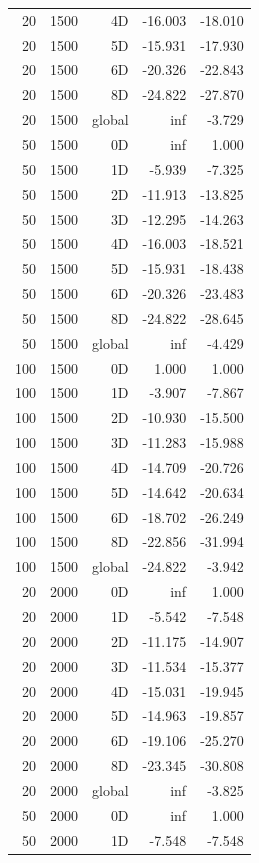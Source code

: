 \begin{longtable}{rrrrr}
20 & 1500 & 4D & -16.003 & -18.010 \\
20 & 1500 & 5D & -15.931 & -17.930 \\
20 & 1500 & 6D & -20.326 & -22.843 \\
20 & 1500 & 8D & -24.822 & -27.870 \\
20 & 1500 & global & inf & -3.729 \\
50 & 1500 & 0D & inf & 1.000 \\
50 & 1500 & 1D & -5.939 & -7.325 \\
50 & 1500 & 2D & -11.913 & -13.825 \\
50 & 1500 & 3D & -12.295 & -14.263 \\
50 & 1500 & 4D & -16.003 & -18.521 \\
50 & 1500 & 5D & -15.931 & -18.438 \\
50 & 1500 & 6D & -20.326 & -23.483 \\
50 & 1500 & 8D & -24.822 & -28.645 \\
50 & 1500 & global & inf & -4.429 \\
100 & 1500 & 0D & 1.000 & 1.000 \\
100 & 1500 & 1D & -3.907 & -7.867 \\
100 & 1500 & 2D & -10.930 & -15.500 \\
100 & 1500 & 3D & -11.283 & -15.988 \\
100 & 1500 & 4D & -14.709 & -20.726 \\
100 & 1500 & 5D & -14.642 & -20.634 \\
100 & 1500 & 6D & -18.702 & -26.249 \\
100 & 1500 & 8D & -22.856 & -31.994 \\
100 & 1500 & global & -24.822 & -3.942 \\
20 & 2000 & 0D & inf & 1.000 \\
20 & 2000 & 1D & -5.542 & -7.548 \\
20 & 2000 & 2D & -11.175 & -14.907 \\
20 & 2000 & 3D & -11.534 & -15.377 \\
20 & 2000 & 4D & -15.031 & -19.945 \\
20 & 2000 & 5D & -14.963 & -19.857 \\
20 & 2000 & 6D & -19.106 & -25.270 \\
20 & 2000 & 8D & -23.345 & -30.808 \\
20 & 2000 & global & inf & -3.825 \\
50 & 2000 & 0D & inf & 1.000 \\
50 & 2000 & 1D & -7.548 & -7.548 \\

\end{longtable}
